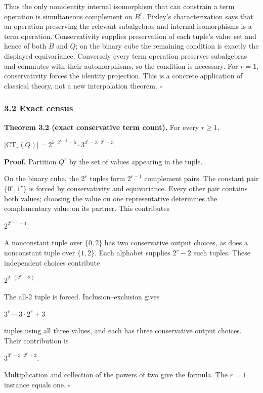 \documentclass[
  11pt,
]{article}
\theoremstyle{definition}
\theoremstyle{remark}
\begin{document}
Thus the only nonidentity internal isomorphism that can constrain a term
operation is simultaneous complement on \(B^r\). Pixley's
characterization says that an operation preserving the relevant
subalgebras and internal isomorphisms is a term operation.
Conservativity supplies preservation of each tuple's value set and hence
of both \(B\) and \(Q\); on the binary cube the remaining condition is
exactly the displayed equivariance. Conversely every term operation
preserves subalgebras and commutes with their automorphisms, so the
condition is necessary. For \(r=1\), conservativity forces the identity
projection. This is a concrete application of classical theory, not a
new interpolation theorem. \(\square\)

\hypertarget{exact-census}{%
\subsubsection{3.2 Exact census}\label{exact-census}}

\textbf{Theorem 3.2 (exact conservative term count).} For every
\(r\ge 1\),

\(|\mathrm{CT}_r(Q)| = 2^{5\mathbin{\cdot}2^{r-1}-5} \mathbin{\cdot} 3^{3^r-3\mathbin{\cdot}2^r+3}\).

\textbf{Proof.} Partition \(Q^r\) by the set of values appearing in the
tuple.

On the binary cube, the \(2^r\) tuples form \(2^{r-1}\) complement
pairs. The constant pair \(\{0^r,1^r\}\) is forced by conservativity and
equivariance. Every other pair contains both values; choosing the value
on one representative determines the complementary value on its partner.
This contributes

\(2^{2^{r-1}-1}\).

A nonconstant tuple over \(\{0,2\}\) has two conservative output
choices, as does a nonconstant tuple over \(\{1,2\}\). Each alphabet
supplies \(2^r-2\) such tuples. These independent choices contribute

\(2^{2\mathbin{\cdot}(2^r-2)}\).

The all-\(2\) tuple is forced. Inclusion--exclusion gives

\(3^r-3\mathbin{\cdot}2^r+3\)

tuples using all three values, and each has three conservative output
choices. Their contribution is

\(3^{3^r-3\mathbin{\cdot}2^r+3}\).

Multiplication and collection of the powers of two give the formula. The
\(r=1\) instance equals one. \(\square\)
\end{document}
